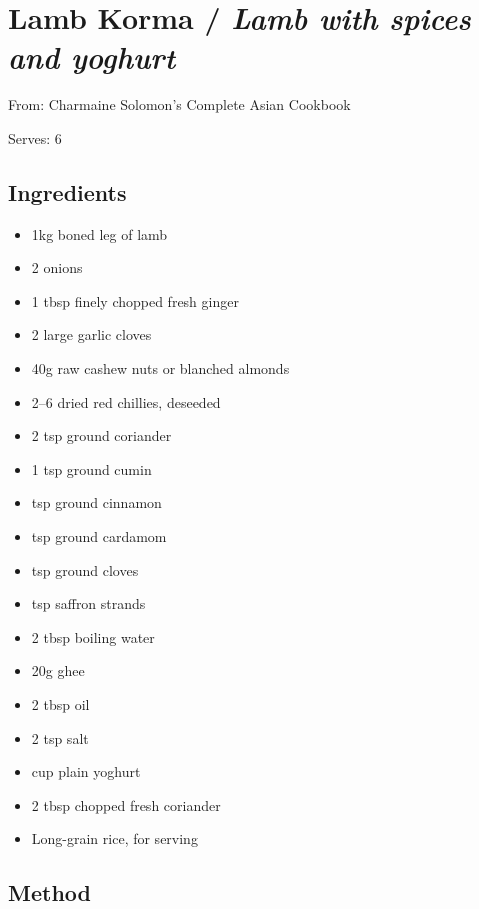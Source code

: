 \clearpage
\section{Lamb Korma / \emph{Lamb with spices and yoghurt}}


From: Charmaine Solomon's Complete Asian Cookbook

Serves: 6

\subsection{Ingredients}

\begin{itemize}
	\item 1kg boned leg of lamb
	\item 2 onions
	\item 1 tbsp finely chopped fresh ginger 
	\item 2 large garlic cloves 
	\item 40g raw cashew nuts or blanched almonds 
	\item 2–6 dried red chillies, deseeded 
	\item 2 tsp ground coriander 
	\item 1 tsp ground cumin 
	\item {} tsp ground cinnamon 
	\item {} tsp ground cardamom 
	\item {} tsp ground cloves 
	\item {} tsp saffron strands 
	\item 2 tbsp boiling water 
	\item 20g ghee 
	\item 2 tbsp oil 
	\item 2 tsp salt 
	\item {} cup plain yoghurt 
	\item 2 tbsp chopped fresh coriander
	\item Long-grain rice, for serving
\end{itemize}

\subsection{Method}

